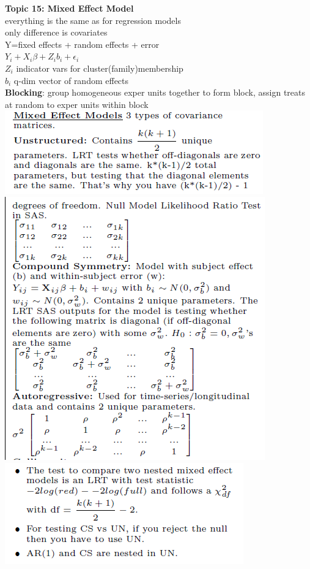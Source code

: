 \documentclass[10pt,landscape]{article}
\newcommand{\B}{\beta}
\begin{document}
\begin{multicols*}{4}
\textbf{Topic 15: Mixed Effect Model}\\
everything is the same as for regression models\\ 
only difference is covariates\\
Y=fixed effects + random effects + error\\ 
$Y_i+X_i\B+Z_ib_i+\epsilon_i$\\
$Z_i$ indicator vars for cluster(family)membership\\
$b_i$ q-dim vector of random effects\\
\textbf{Blocking}:
group homogeneous exper units together to form
block, assign treats at random to exper units within block\\
\includegraphics[scale=.6]{fig/not.png}\\
\includegraphics[scale=.6]{fig/notes.png}\\
\includegraphics[scale=.6]{fig/me.png}\\

\end{multicols*}
\end{document}

